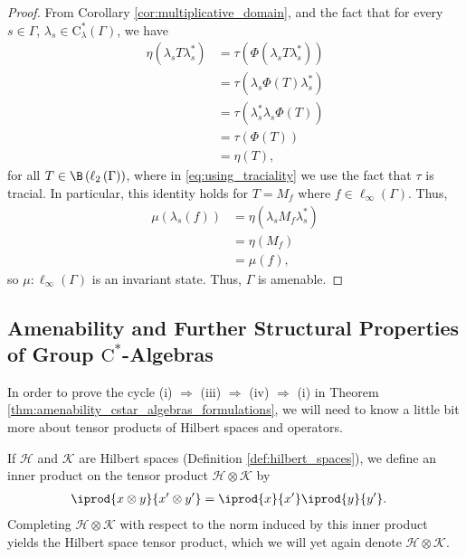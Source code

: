 \begin{proof}
  From Corollary \ref{cor:multiplicative_domain}, and the fact that for every $s\in\Gamma$, $\lambda_s\in \mathrm{C}^{\ast}_{\lambda}\left( \Gamma \right)$, we have
  \begin{align*}
    \eta\left( \lambda_s T \lambda_s^{\ast} \right) &= \tau\left( \Phi\left( \lambda_s T \lambda_s^{\ast} \right) \right)\\
                                                    &= \tau\left( \lambda_s \Phi(T) \lambda_s^{\ast}\right)\\
                                                    &= \tau\left( \lambda_s^{\ast}\lambda_s\Phi(T) \right)\label{eq:using_traciality}\tag{\textasteriskcentered}\\
                                                    &= \tau\left( \Phi\left( T \right) \right)\\
                                                    &= \eta(T),
  \end{align*}
  for all $T\in \B\left( \ell_2\left( \Gamma \right) \right)$, where in \eqref{eq:using_traciality} we use the fact that $\tau$ is tracial. In particular, this identity holds for $T= M_f$ where $f\in \ell_{\infty}\left( \Gamma \right)$. Thus,
  \begin{align*}
    \mu\left( \lambda_s(f) \right) &= \eta\left( \lambda_sM_f\lambda_s^{\ast} \right)\\
                                   &= \eta\left( M_f \right)\\
                                   &= \mu\left( f \right),
  \end{align*}
  so $\mu\colon \ell_{\infty}\left( \Gamma \right)$ is an invariant state. Thus, $\Gamma$ is amenable.
\end{proof}

\subsection{Amenability and Further Structural Properties of Group $\mathrm{C}^{\ast}$-Algebras}%
In order to prove the cycle (i) $\Rightarrow$ (iii) $\Rightarrow$ (iv) $\Rightarrow$ (i) in Theorem \ref{thm:amenability_cstar_algebras_formulations}, we will need to know a little bit more about tensor products of Hilbert spaces and operators.\newline

If $\mathcal{H}$ and $\mathcal{K}$ are Hilbert spaces (Definition \ref{def:hilbert_spaces}), we define an inner product on the tensor product $\mathcal{H}\otimes \mathcal{K}$ by
\begin{align*}
  \iprod{x\otimes y}{x'\otimes y'} &= \iprod{x}{x'} \iprod{y}{y'}.
\end{align*}
Completing $\mathcal{H}\otimes \mathcal{K}$ with respect to the norm induced by this inner product yields the Hilbert space tensor product, which we will yet again denote $\mathcal{H}\otimes \mathcal{K}$.\newline

